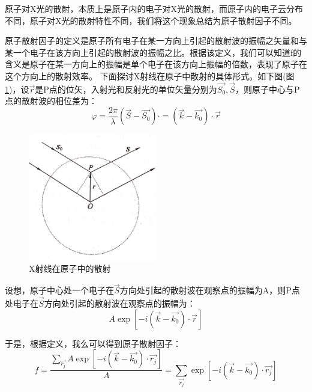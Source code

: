 \documentclass{ctexart}
\begin{document}
        原子对X光的散射，本质上是原子内的电子对X光的散射，而原子内的电子云分布不同，原子对X光的散射特性不同，我们将这个现象总结为原子散射因子不同。
        
        原子散射因子的定义是原子所有电子在某一方向上引起的散射波的振幅之矢量和与某一个电子在该方向上引起的散射波的振幅之比。根据该定义，我们可以知道f的含义是原子在某一方向上的振幅是单个电子在该方向上振幅的倍数，表现了原子在这个方向上的散射效率。
        下面探讨X射线在原子中散射的具体形式。如下图(图\ref{fig:diffractioninatom})，设$\vec{r}$是P点的位矢，入射光和反射光的单位矢量分别为$\vec{S_0},\vec{S}$，则原子中心与P点的散射波的相位差为：
        \begin{equation}
            \varphi=\frac{2\pi}{\lambda}(\vec{S}-\vec{S_0})\cdot=(\vec{k}-\vec{k_0})\cdot \vec{r}
        \end{equation}
        \begin{figure}[H]
            \centering
            \includegraphics[width=0.5\textwidth]{figure/X射线在原子中的散射.jpg}
            \caption{X射线在原子中的散射}
            \label{fig:diffractioninatom}
        \end{figure}
        
        设想，原子中心处一个电子在$\vec{S}$方向处引起的散射波在观察点的振幅为A，则P点处电子在$\vec{S}$方向处引起的散射波在观察点的振幅为：
        \begin{equation}
            A\exp{[-i(\vec{k}-\vec{k_0})\cdot \vec{r}]}
        \end{equation}
        
        于是，根据定义，我么可以得到原子散射因子：
        \begin{equation}
            f=\frac{\sum_{\vec{r_j}}A\exp{[-i(\vec{k}-\vec{k_0})\cdot \vec{r_j}]}}{A}=\sum_{\vec{r_j}}\exp{[-i(\vec{k}-\vec{k_0})\cdot \vec{r_j}]}
        \end{equation}
        
\end{document}

